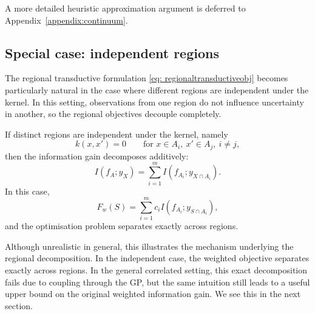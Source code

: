 A more detailed heuristic approximation argument is deferred to Appendix~\ref{appendix:continuum}.

\subsection{Special case: independent regions} \label{sec: indepregions}

The regional transductive formulation \eqref{eq: regionaltransductiveobj} becomes particularly natural in the case where different regions are independent under the kernel. In this setting, observations from one region do not influence uncertainty in another, so the regional objectives decouple completely.

If distinct regions are independent under the kernel, namely
\begin{equation*}
k(x,x')=0
\qquad
\text{for } x\in A_i,\ x'\in A_j,\ i\neq j,
\end{equation*}
then the information gain decomposes additively:
\begin{equation*}
I(f_A;y_X)
=
\sum_{i=1}^m
I(f_{A_i};y_{X\cap A_i}).
\end{equation*}
In this case,
\begin{equation*}
F_w(S)
=
\sum_{i=1}^m
c_i
I(f_{A_i};y_{S\cap A_i}),
\end{equation*}
and the optimisation problem separates exactly across regions.

Although unrealistic in general, this illustrates the mechanism underlying the regional decomposition. In the independent case, the weighted objective separates exactly across regions. In the general correlated setting, this exact decomposition fails due to coupling through the GP, but the same intuition still leads to a useful upper bound on the original weighted information gain. We see this in the next section.